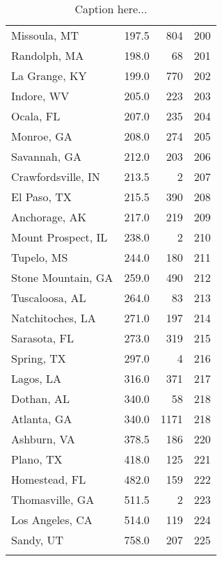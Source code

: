 \begin{longtable}{lrrr}
Missoula, MT         &   197.5 &    804 &   200 \\
Randolph, MA         &   198.0 &     68 &   201 \\
La Grange, KY        &   199.0 &    770 &   202 \\
Indore, WV           &   205.0 &    223 &   203 \\
Ocala, FL            &   207.0 &    235 &   204 \\
Monroe, GA           &   208.0 &    274 &   205 \\
Savannah, GA         &   212.0 &    203 &   206 \\
Crawfordsville, IN   &   213.5 &      2 &   207 \\
El Paso, TX          &   215.5 &    390 &   208 \\
Anchorage, AK        &   217.0 &    219 &   209 \\
Mount Prospect, IL   &   238.0 &      2 &   210 \\
Tupelo, MS           &   244.0 &    180 &   211 \\
Stone Mountain, GA   &   259.0 &    490 &   212 \\
Tuscaloosa, AL       &   264.0 &     83 &   213 \\
Natchitoches, LA     &   271.0 &    197 &   214 \\
Sarasota, FL         &   273.0 &    319 &   215 \\
Spring, TX           &   297.0 &      4 &   216 \\
Lagos, LA            &   316.0 &    371 &   217 \\
Dothan, AL           &   340.0 &     58 &   218 \\
Atlanta, GA          &   340.0 &   1171 &   218 \\
Ashburn, VA          &   378.5 &    186 &   220 \\
Plano, TX            &   418.0 &    125 &   221 \\
Homestead, FL        &   482.0 &    159 &   222 \\
Thomasville, GA      &   511.5 &      2 &   223 \\
Los Angeles, CA      &   514.0 &    119 &   224 \\
Sandy, UT            &   758.0 &    207 &   225 \\
        \caption{Caption here...}
        \label{tab:label_here}
\end{longtable}
